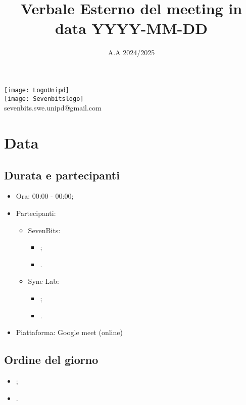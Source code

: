 \documentclass[10pt]{article}
\title{Verbale Esterno del meeting in data YYYY-MM-DD} %
\date{A.A 2024/2025}
\begin{document}
\maketitle
\center 
\texttt{[image: LogoUnipd]}\\
\texttt{[image: Sevenbitslogo]}\\
sevenbits.swe.unipd@gmail.com\\
\vspace{2mm}

\newpage
\raggedright
\tableofcontents

\newpage
\section{Data} %
\subsection{Durata e partecipanti}
\begin{itemize}
\item Ora: 00:00 - 00:00; %
\item Partecipanti: 	
	\begin{itemize}
            \item SevenBits:
            \begin{itemize}
                \item ;
                \item .
	    \end{itemize}
            \item Sync Lab:
            \begin{itemize}
                \item ;
                \item .
	    \end{itemize}
	\end{itemize}
\item Piattaforma: Google meet (online)
\end{itemize}

\subsection{Ordine del giorno}
\begin{itemize}
    \item ;
    \item .
\end{itemize}
\end{document}
